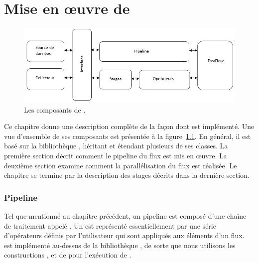 
\chapter{Mise en \oe{}uvre de \PpFf}
\label{implementation.chap}




\begin{figure}[ht]
\centering
     \includegraphics[width=1.0\textwidth]{Figures/AllComponentsAPI.jpg}
      \caption{Les composants de .}
       \label{AllComponentsAPI.fig}
\end{figure}


Ce chapitre donne une description compl\`ete de la fa\c{c}on dont  est impl\'ement\'e. Une vue d'ensemble de ses composants est pr\'esent\'ee à la figure~\ref{AllComponentsAPI.fig}. En g\'en\'eral, il est bas\'e sur la biblioth\`eque , h\'eritant et \'etendant plusieurs de ses classes.
La premi\`ere section d\'ecrit  comment le pipeline du flux est mis en œuvre. La deuxi\`eme section examine  comment la parall\'elisation du flux est r\'ealis\'ee. Le chapitre se termine par la description des stages d\'ecrits dans la derni\`ere section.


\subsection{Pipeline}

Tel que mentionn\'e au chapitre pr\'ec\'edent, un pipeline est compos\'e d'une cha\^ine de traitement appel\'e . Un  est repr\'esent\'e essentiellement par une s\'erie d'op\'erateurs d\'efinis par l'utilisateur qui sont appliqu\'es aux \'el\'ements d'un flux.  est impl\'ement\'e au-dessus de la biblioth\`eque , de sorte que nous utilisons les constructions ,  et  de  pour l'ex\'ecution de . 


